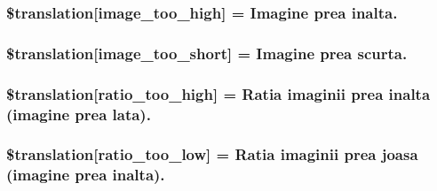\subsubsection[{\$translation}]{\setlength{\rightskip}{0pt plus 5cm}\$translation\mbox{[}\textquotesingle{}image\+\_\+too\+\_\+high\textquotesingle{}\mbox{]} = \textquotesingle{}Imagine prea inalta.\textquotesingle{}}\label{class_8upload_8ro___r_o_8php_aa27bde361343f3b63c7cd441860024f8}
\hypertarget{class_8upload_8ro___r_o_8php_a86fcd4e1157b00032df451188d735527}{}
\subsubsection[{\$translation}]{\setlength{\rightskip}{0pt plus 5cm}\$translation\mbox{[}\textquotesingle{}image\+\_\+too\+\_\+short\textquotesingle{}\mbox{]} = \textquotesingle{}Imagine prea scurta.\textquotesingle{}}\label{class_8upload_8ro___r_o_8php_a86fcd4e1157b00032df451188d735527}
\hypertarget{class_8upload_8ro___r_o_8php_a23396f6ce7f31e5e5f1b57580621d982}{}
\subsubsection[{\$translation}]{\setlength{\rightskip}{0pt plus 5cm}\$translation\mbox{[}\textquotesingle{}ratio\+\_\+too\+\_\+high\textquotesingle{}\mbox{]} = \textquotesingle{}Ratia imaginii prea inalta (imagine prea lata).\textquotesingle{}}\label{class_8upload_8ro___r_o_8php_a23396f6ce7f31e5e5f1b57580621d982}
\hypertarget{class_8upload_8ro___r_o_8php_ac533b9a479f056b0b8623e4268f068c2}{}
\subsubsection[{\$translation}]{\setlength{\rightskip}{0pt plus 5cm}\$translation\mbox{[}\textquotesingle{}ratio\+\_\+too\+\_\+low\textquotesingle{}\mbox{]} = \textquotesingle{}Ratia imaginii prea joasa (imagine prea inalta).\textquotesingle{}}\label{class_8upload_8ro___r_o_8php_ac533b9a479f056b0b8623e4268f068c2}
\hypertarget{class_8upload_8ro___r_o_8php_aa4051ef64e94a3f8295c63cf85544016}{}
